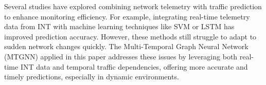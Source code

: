 Several studies have explored combining network telemetry with traffic prediction to enhance monitoring efficiency. For example, integrating real-time telemetry data from INT with machine learning techniques like SVM or LSTM has improved prediction accuracy. However, these methods still struggle to adapt to sudden network changes quickly. The Multi-Temporal Graph Neural Network (MTGNN) applied in this paper addresses these issues by leveraging both real-time INT data and temporal traffic dependencies, offering more accurate and timely predictions, especially in dynamic environments.